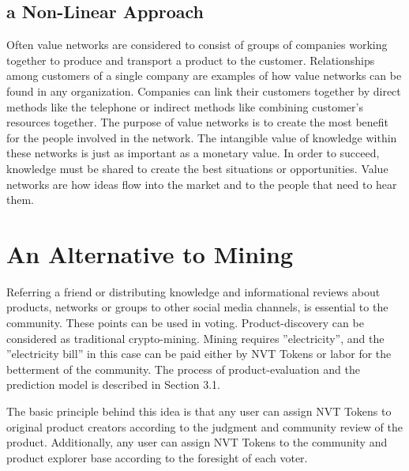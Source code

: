 
\subsection{a Non-Linear Approach}
Often value networks are considered to consist of groups of companies working together to produce and transport a product to the customer. Relationships among customers of a single company are examples of how value networks can be found in any organization. Companies can link their customers together by direct methods like the telephone or indirect methods like combining customer’s resources together. The purpose of value networks is to create the most benefit for the people involved in the network. The intangible value of knowledge within these networks is just as important as a monetary value. In order to succeed, knowledge must be shared to create the best situations or opportunities. Value networks are how ideas flow into the market and to the people that need to hear them.


\section{An Alternative to Mining}

Referring a friend or distributing knowledge and informational reviews about products, networks or groups to other social media channels, is essential to the community. These points can be used in voting. Product-discovery can be considered as traditional crypto-mining. Mining requires ”electricity”, and the ”electricity bill” in this case can be paid either by NVT Tokens or labor for the betterment of the community. The process of product-evaluation and the prediction model is described in Section 3.1.

The basic principle behind this idea is that any user can assign NVT Tokens to original product creators according to the judgment and community review of the product. Additionally, any user can assign NVT Tokens to the community and product explorer base according to the foresight of each voter.


